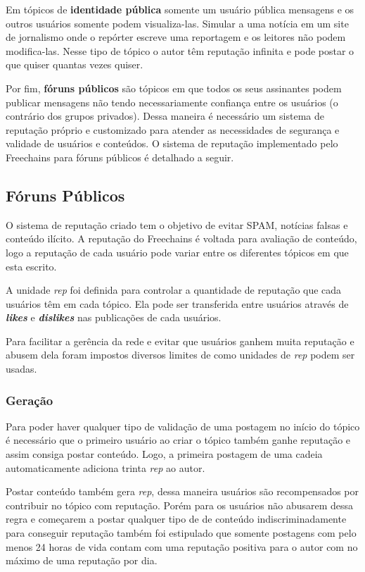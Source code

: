 \documentclass[12pt]{article}
\newcommand{\FC} {Freechains\xspace}
\begin{document}
Em tópicos de \textbf{identidade pública} somente um usuário pública mensagens e os outros usuários somente podem visualiza-las. Simular a uma notícia em um site de jornalismo onde o repórter escreve uma reportagem e os leitores não podem modifica-las. Nesse tipo de tópico o autor têm reputação infinita e pode postar o que quiser quantas vezes quiser.

Por fim, \textbf{fóruns públicos} são tópicos em que todos os seus assinantes podem publicar mensagens não tendo necessariamente confiança entre os usuários (o contrário dos grupos privados). Dessa maneira é necessário um sistema de reputação próprio e customizado para atender as necessidades de segurança e validade de usuários e conteúdos. O sistema de reputação implementado pelo \FC para fóruns públicos é detalhado a seguir.

\subsection{Fóruns Públicos} \label{subsec: forunspub}

O sistema de reputação criado tem o objetivo de evitar SPAM, notícias falsas e conteúdo ilícito. A reputação do \FC é voltada para avaliação de conteúdo, logo a reputação de cada usuário pode variar entre os diferentes tópicos em que esta escrito. 

A unidade \emph{rep} foi definida para controlar a quantidade de reputação que cada usuários têm em cada tópico. Ela pode ser transferida entre usuários através de \textbf{\emph{likes}} e \textbf{\emph{dislikes}} nas publicações de cada usuários.

Para facilitar a gerência da rede e evitar que usuários ganhem muita reputação e abusem dela foram impostos diversos limites de como unidades de \emph{rep} podem ser usadas. 

\subsubsection{Geração} \label{subsubsec:geracao}

Para poder haver qualquer tipo de validação de uma postagem no início do tópico é necessário que o primeiro usuário ao criar o tópico também ganhe reputação e assim consiga postar conteúdo. Logo, a primeira postagem de uma cadeia automaticamente adiciona trinta \emph{rep} ao autor. 

Postar conteúdo também gera \emph{rep}, dessa maneira usuários são recompensados por contribuir no tópico com reputação. Porém para os usuários não abusarem dessa regra e começarem a postar qualquer tipo de de conteúdo indiscriminadamente para conseguir reputação também foi estipulado que somente postagens com pelo menos 24 horas de vida contam com uma reputação positiva para o autor com no máximo de uma reputação por dia. 
\end{document}
